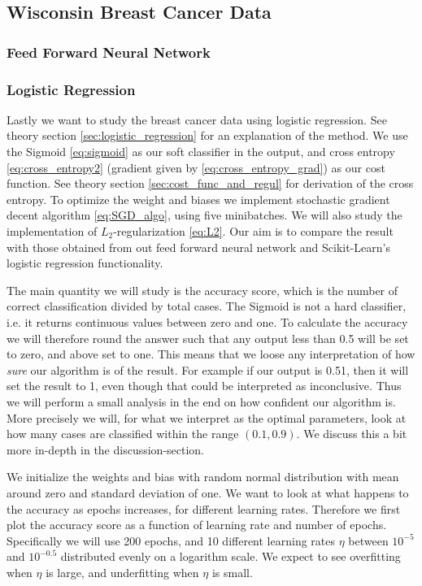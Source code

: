 \documentclass[12pt]{extarticle}
\begin{document}
\subsection{Wisconsin Breast Cancer Data}
\subsubsection{Feed Forward Neural Network}
\subsubsection{Logistic Regression}
Lastly we want to study the breast cancer data using logistic regression. See theory section \ref{sec:logistic_regression} for an explanation of the method. We use the Sigmoid \eqref{eq:sigmoid} as our soft classifier in the output, and cross entropy \eqref{eq:cross_entropy2} (gradient given by \eqref{eq:cross_entropy_grad}) as our cost function. See theory section \ref{sec:cost_func_and_regul} for derivation of the cross entropy. To optimize the weight and biases we implement stochastic gradient decent algorithm \eqref{eq:SGD_algo}, using five minibatches. We will also study the implementation of $L_2$-regularization \eqref{eq:L2}. Our aim is to compare the result with those obtained from out feed forward neural network and Scikit-Learn's logistic regression functionality.

The main quantity we will study is the accuracy score, which is the number of correct classification divided by total cases. The Sigmoid is not a hard classifier, i.e. it returns continuous values between zero and one. To calculate the accuracy we will therefore round the answer such that any output less than 0.5 will be set to zero, and above set to one. This means that we loose any interpretation of how \emph{sure} our algorithm is of the result. For example if our output is 0.51, then it will set the result to 1, even though that could be interpreted as inconclusive. Thus we will perform a small analysis in the end on how confident our algorithm is. More precisely we will, for what we interpret as the optimal parameters, look at how many cases are classified within the range $(0.1, 0.9)$. We discuss this a bit more in-depth in the discussion-section.

We initialize the weights and bias with random normal distribution with mean around zero and standard deviation of one. We want to look at what happens to the accuracy as epochs increases, for different learning rates. Therefore we first plot the accuracy score as a function of learning rate and number of epochs. Specifically we will use 200 epochs, and 10 different learning rates $\eta$ between $10^{-5}$ and $10^{-0.5}$ distributed evenly on a logarithm scale. We expect to see overfitting when $\eta$ is large, and underfitting when $\eta$ is small.
\end{document}
